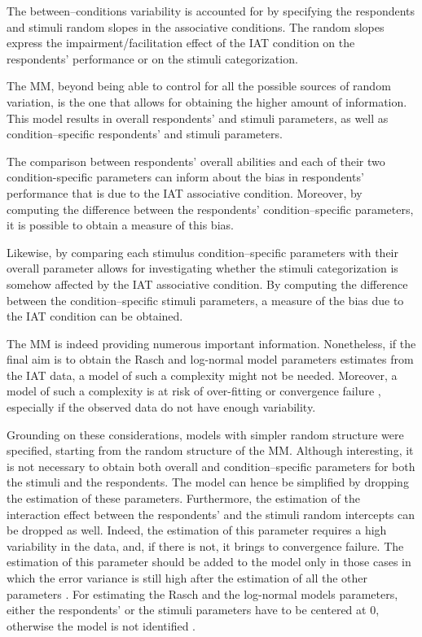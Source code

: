 \documentclass[12pt]{book}
\begin{document}
The between--conditions variability is accounted for by specifying the respondents and stimuli random slopes in the associative conditions. The random slopes express the impairment/facilitation effect of the IAT condition on the respondents' performance or on the stimuli categorization. 

The MM, beyond being able to control for all the possible sources of random variation, is the one that allows for obtaining the higher amount of information. This model results in overall respondents' and stimuli parameters, as well as condition--specific respondents' and stimuli parameters. 

The comparison between respondents’ overall abilities and each of their two condition-specific parameters can inform about the bias in respondents' performance that is due to the IAT associative condition. Moreover, by computing the difference between the respondents' condition--specific parameters, it is possible to obtain a measure of this bias. 

Likewise, by comparing each stimulus condition--specific parameters with their overall parameter allows for investigating whether the stimuli categorization is somehow affected by the IAT associative condition. By computing the difference between the condition--specific stimuli parameters, a measure of the bias due to the IAT condition can be obtained. 

The MM is indeed providing numerous important information. Nonetheless, if the final aim is to obtain the Rasch and log-normal model parameters estimates from the IAT data, a model of such a complexity might not be needed. Moreover, a model of such a complexity is at risk of over-fitting or convergence failure \cite{Bates2015}, especially if the observed data do not have enough variability. 

Grounding on these considerations, models with simpler random structure were specified, starting from the random structure of the MM. Although interesting, it is not necessary to obtain both overall and condition--specific parameters for both the stimuli and the respondents. The model can hence be simplified by dropping the estimation of these parameters. Furthermore, the estimation of the interaction effect between the respondents' and the stimuli random intercepts can be dropped as well. Indeed, the estimation of this parameter requires a high variability in the data, and, if there is not, it brings to convergence failure. The estimation of this parameter should be added to the model only in those cases in which the error variance is still high after the estimation of all the other parameters \cite{Westfall2014}. For estimating the Rasch and the log-normal models parameters, either the respondents' or the stimuli parameters have to be centered at 0, otherwise the model is not identified \cite{Anselmi2011,Gelman2007}.
\end{document}
